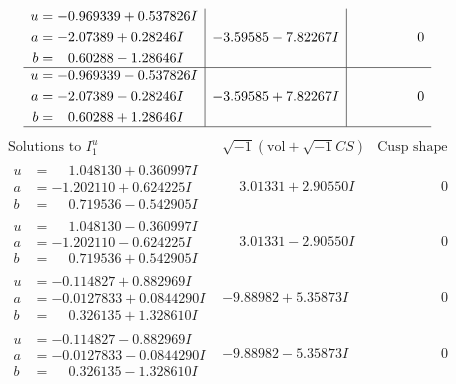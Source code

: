 \documentclass[1p]{elsarticle_modified}
\theoremstyle{definition}
\newcommand{\I}{\sqrt{-1}}
\begin{document}
$$\begin{array}{c|c|c}
\begin{aligned}
u &= -0.969339 + 0.537826 I \\
a &= -2.07389 + 0.28246 I \\
b &= \phantom{-}0.60288 - 1.28646 I\end{aligned}
 & -3.59585 - 7.82267 I & \phantom{-0.000000 } 0 \\ \hline\begin{aligned}
u &= -0.969339 - 0.537826 I \\
a &= -2.07389 - 0.28246 I \\
b &= \phantom{-}0.60288 + 1.28646 I\end{aligned}
 & -3.59585 + 7.82267 I & \phantom{-0.000000 } 0\\
 \hline 
 \end{array}$$\newpage$$\begin{array}{c|c|c}  
\text{Solutions to }I^u_{1}& \I (\text{vol} + \sqrt{-1}CS) & \text{Cusp shape}\\
 \hline 
\begin{aligned}
u &= \phantom{-}1.048130 + 0.360997 I \\
a &= -1.202110 + 0.624225 I \\
b &= \phantom{-}0.719536 - 0.542905 I\end{aligned}
 & \phantom{-}3.01331 + 2.90550 I & \phantom{-0.000000 } 0 \\ \hline\begin{aligned}
u &= \phantom{-}1.048130 - 0.360997 I \\
a &= -1.202110 - 0.624225 I \\
b &= \phantom{-}0.719536 + 0.542905 I\end{aligned}
 & \phantom{-}3.01331 - 2.90550 I & \phantom{-0.000000 } 0 \\ \hline\begin{aligned}
u &= -0.114827 + 0.882969 I \\
a &= -0.0127833 + 0.0844290 I \\
b &= \phantom{-}0.326135 + 1.328610 I\end{aligned}
 & -9.88982 + 5.35873 I & \phantom{-0.000000 } 0 \\ \hline\begin{aligned}
u &= -0.114827 - 0.882969 I \\
a &= -0.0127833 - 0.0844290 I \\
b &= \phantom{-}0.326135 - 1.328610 I\end{aligned}
 & -9.88982 - 5.35873 I & \phantom{-0.000000 } 0 \\ \hline\begin{aligned}

\end{aligned}
\end{array}$$
\end{document}
